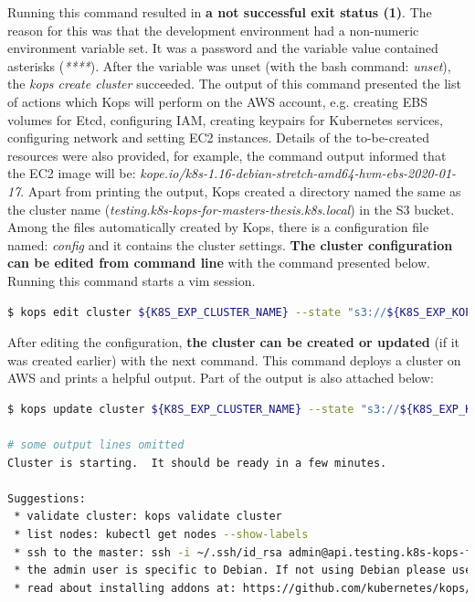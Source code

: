 Running this command resulted in \textbf{a not successful exit status (1)}. The reason for this was that the development environment had a non-numeric environment variable set. It was a password and the variable value contained asterisks (\textit{****}). After the variable was unset (with the bash command: \textit{unset}), the \textit{kops create cluster} succeeded. The output of this command presented the list of actions which Kops will perform on the AWS account, e.g. creating EBS volumes for Etcd, configuring IAM, creating keypairs for Kubernetes services, configuring network and setting EC2 instances. Details of the to-be-created resources were also provided, for example, the command output informed that the EC2 image will be: \textit{kope.io/k8s-1.16-debian-stretch-amd64-hvm-ebs-2020-01-17}. Apart from printing the output, Kops created a directory named the same as the cluster name (\textit{testing.k8s-kops-for-masters-thesis.k8s.local}) in the S3 bucket. Among the files automatically created by Kops, there is a configuration file named: \textit{config} and it contains the cluster settings. \textbf{The cluster configuration can be edited from command line} with the command presented below. Running this command starts a vim session.
\begin{lstlisting}[basicstyle=\tiny,caption={Command used to edit a Kubernetes cluster managed by Kops},captionpos=b,language=Bash,xleftmargin=1cm]
$ kops edit cluster ${K8S_EXP_CLUSTER_NAME} --state "s3://${K8S_EXP_KOPS_S3_BUCKET}"
\end{lstlisting}
After editing the configuration, \textbf{the cluster can be created or updated} (if it was created earlier) with the next command. This command deploys a cluster on AWS and prints a helpful output. Part of the output is also attached below:
\begin{lstlisting}[basicstyle=\tiny,caption={Command used to deploy a Kubernetes cluster with Kops},captionpos=b,language=Bash,xleftmargin=1cm]
$ kops update cluster ${K8S_EXP_CLUSTER_NAME} --state "s3://${K8S_EXP_KOPS_S3_BUCKET}" --yes

# some output lines omitted
Cluster is starting.  It should be ready in a few minutes.

Suggestions:
 * validate cluster: kops validate cluster
 * list nodes: kubectl get nodes --show-labels
 * ssh to the master: ssh -i ~/.ssh/id_rsa admin@api.testing.k8s-kops-for-masters-thesis.k8s.local
 * the admin user is specific to Debian. If not using Debian please use the appropriate user based on your OS.
 * read about installing addons at: https://github.com/kubernetes/kops/blob/master/docs/operations/addons.md.
\end{lstlisting}

